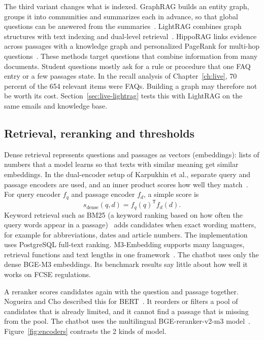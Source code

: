 The third variant changes what is indexed. GraphRAG builds an entity graph, groups it into communities and summarizes each in advance, so that global questions can be answered from the summaries~\cite{edge2024graphrag}. LightRAG combines graph structures with text indexing and dual-level retrieval~\cite{guo2024lightrag}. HippoRAG links evidence across passages with a knowledge graph and personalized PageRank for multi-hop questions~\cite{gutierrez2024hipporag}. These methods target questions that combine information from many documents. Student questions mostly ask for a rule or procedure that one FAQ entry or a few passages state. In the recall analysis of Chapter~\ref{ch:live}, 70 percent of the 654 relevant items were FAQs. Building a graph may therefore not be worth its cost. Section~\ref{sec:live-lightrag} tests this with LightRAG on the same emails and knowledge base.



\subsection{Retrieval, reranking and thresholds}

Dense retrieval represents questions and passages as vectors (embeddings): lists of numbers that a model learns so that texts with similar meaning get similar embeddings. In the dual-encoder setup of Karpukhin et al., separate query and passage encoders are used, and an inner product scores how well they match~\cite{karpukhin2020dpr}. For query encoder $f_q$ and passage encoder $f_d$, a simple score is
\[
  s_{\mathrm{dense}}(q,d)=f_q(q)^{\mathsf{T}}f_d(d).
\]
Keyword retrieval such as BM25 (a keyword ranking based on how often the query words appear in a passage)~\cite{robertson2009bm25} adds candidates when exact wording matters, for example for abbreviations, dates and article numbers. The implementation uses PostgreSQL full-text ranking. M3-Embedding supports many languages, retrieval functions and text lengths in one framework~\cite{chen2024m3}. The chatbot uses only the dense BGE-M3 embeddings. Its benchmark results say little about how well it works on FCSE regulations.

A reranker scores candidates again with the question and passage together. Nogueira and Cho described this for BERT~\cite{nogueira2019bertrerank}. It reorders or filters a pool of candidates that is already limited, and it cannot find a passage that is missing from the pool. The chatbot uses the multilingual BGE-reranker-v2-m3 model~\cite{baaiBgeRerankerV2M3}. Figure~\ref{fig:encoders} contrasts the 2 kinds of model.

